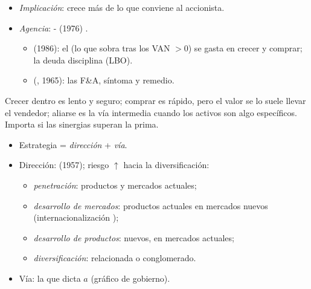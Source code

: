 \documentclass{article}
\begin{document}
\begin{columnas}
\begin{itemize}
  \begin{itemize}
  \item que la \emph{ratio de valoración} (valor de mercado / contable) no caiga tanto como para ser absorbida;
  \item ratio $\approx q$ de  .
  \end{itemize}
\item \emph{Implicación}: crece más de lo que conviene al accionista.
\item \emph{Agencia}: - (1976) .
  \begin{itemize}
  \item {} (1986): el  (lo que sobra tras los VAN $>0$) se gasta en crecer y comprar; la deuda disciplina (LBO).
  \item {} (, 1965): las F\&A, síntoma y remedio.
  \end{itemize}
\end{itemize}

\begin{ideaclave}
Crecer dentro es lento y seguro; comprar es rápido, pero el valor se lo suele llevar el vendedor; aliarse es la vía intermedia cuando los activos son algo específicos. Importa si las sinergias superan la prima.
\end{ideaclave}
\begin{itemize}
\item Estrategia = \emph{dirección} + \emph{vía}.
\item Dirección:  (1957); riesgo $\uparrow$ hacia la diversificación:
  \begin{itemize}
  \item \emph{penetración}: productos y mercados actuales;
  \item \emph{desarrollo de mercados}: productos actuales en mercados nuevos (internacionalización );
  \item \emph{desarrollo de productos}: nuevos, en mercados actuales;
  \item \emph{diversificación}: relacionada o conglomerado.
  \end{itemize}
\item Vía: la que dicta $a$ (gráfico de gobierno).
\end{itemize}


\end{columnas}
\end{document}
